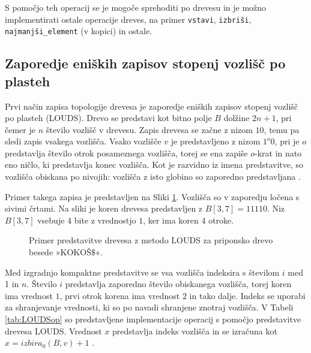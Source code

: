 S pomočjo teh operacij se je mogoče sprehoditi po drevesu in je možno implementirati ostale operacije dreves, na primer \texttt{vstavi}, \texttt{izbriši}, \texttt{najmanjši\_element} (v kopici) in ostale.

\subsection{Zaporedje eniških zapisov stopenj vozlišč po plasteh}\label{sec:LOUDS}

Prvi način zapisa topologije drevesa je zaporedje eniških zapisov stopenj vozlišč po plasteh (LOUDS). Drevo se predstavi kot bitno polje $B$ dolžine $2n+1$, pri čemer je $n$ število vozlišč v drevesu. Zapis drevesa se začne z nizom $10$, temu pa sledi zapis vsakega vozlišča. Vsako vozlišče $v$ je predstavljeno z nizom $1^o0$, pri je $o$ predstavlja število otrok posameznega vozlišča, torej se ena zapiše $o$-krat in nato eno ničlo, ki predstavlja konec vozlišča. Kot je razvidno iz imena predstavitve, so vozlišča obiskana po nivojih: vozlišča z isto globino so zaporedno predstavljana \cite{Navarro2016}.

Primer takega zapisa je predstavljen na Sliki \ref{fig:LOUDS}. Vozlišča so v zaporedju ločena s sivimi črtami. Na sliki je koren drevesa predstavljen z $B[3,7]=11110$. Niz $B[3,7]$ vsebuje 4 bite z vrednostjo $1$, ker ima koren $4$ otroke.

\begin{figure}[htb]
    \begin{center}
        
        \caption{Primer predstavitve drevesa z metodo LOUDS za priponsko drevo besede »KOKOŠ$\$$«.} 
        \label{fig:LOUDS}
    \end{center}
\end{figure}


Med izgradnjo kompaktne predstavitve se vsa vozlišča indeksira s številom $i$  med 1 in $n$. Število $i$ predstavlja zaporedno število obiskanega vozlišča, torej koren ima vrednost $1$, prvi otrok korena ima vrednost $2$ in tako dalje. Indeks se uporabi za shranjevanje vrednosti, ki so po navadi shranjene znotraj vozlišča. V Tabeli \ref{tab:LOUDSop} so predstavljene implementacije operacij s pomočjo predstavitve drevesa LOUDS. Vrednost $x$ predstavlja indeks vozlišča in se izračuna kot $x=izbira_0(B,v)+1$ \cite{Navarro2016}.

